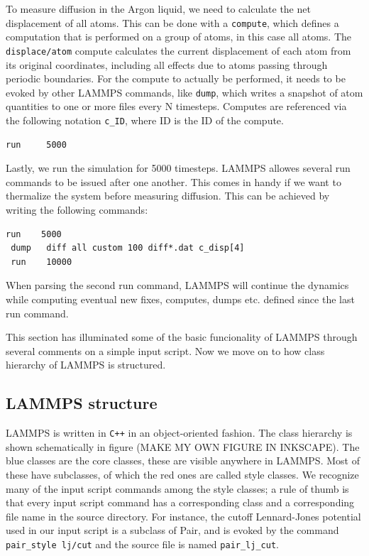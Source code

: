 \documentclass[twoside,english]{uiofysmaster}
\begin{document}
To measure diffusion in the 
Argon liquid, we need to calculate the net
displacement of all atoms. This can be done with a 
\texttt{compute}, which defines a computation that is 
performed on a group of atoms, in this case all atoms.
The \texttt{displace/atom} compute calculates the current
displacement of each atom from its original
coordinates, including all effects due to atoms
passing through periodic boundaries.
For the compute to actually be performed, it needs
to be evoked by other LAMMPS commands, like \texttt{dump}, 
which writes a snapshot of atom quantities to one 
or more files every N timesteps. Computes are 
referenced via the following notation \texttt{c\_ID}, where
ID is the ID of the compute. 
\begin{lstlisting}[style=lammps]
run		5000
\end{lstlisting}
Lastly, we run the simulation for 5000 timesteps. 
LAMMPS allowes several run commands to be issued
after one another. This comes in handy if we want
to thermalize the system before measuring diffusion.
This can be achieved by writing the following commands:
\begin{lstlisting}[style=lammps]
 run 	5000
 dump 	diff all custom 100 diff*.dat c_disp[4]
 run 	10000
\end{lstlisting}
When parsing the second run command, LAMMPS will
continue the dynamics while computing eventual
new fixes, computes, dumps etc. defined since
the last run command. 

This section has illuminated some of the basic
funcionality of LAMMPS through several comments
on a simple input script. Now we move on to
how class hierarchy of LAMMPS is structured. 

\subsection{LAMMPS structure}
LAMMPS is written in \texttt{C++} in an object-oriented
fashion. The class hierarchy is shown schematically
in figure (MAKE MY OWN FIGURE IN INKSCAPE). 
The blue classes are the core classes, these
are visible anywhere in LAMMPS.
Most of these have subclasses, of which the red ones
are called style classes. We recognize many 
of the input script commands among the style
classes; a rule of thumb is that every input script
command has a corresponding class and a
corresponding file name in the source directory. 
For instance, the cutoff Lennard-Jones potential
used in our input script is a subclass of Pair,
and is evoked by the command
\texttt{pair\_style lj/cut} and the source file is named
\texttt{pair\_lj\_cut}. 
\end{document}
